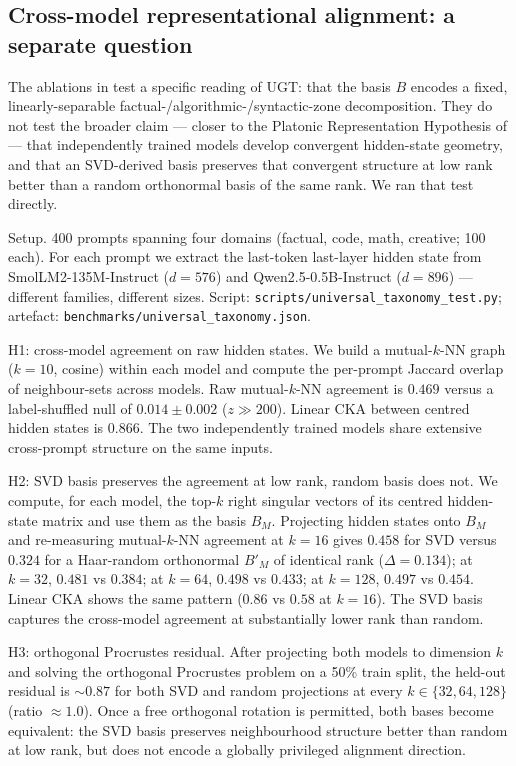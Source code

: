 \documentclass[11pt]{article}
\providecommand{\citet}[1]{\textcite{#1}}
\begin{document}
\subsection{Cross-model representational alignment: a separate question}
\label{sec:ugt-cross-model-universality}

The ablations in  test a specific reading
of UGT: that the basis $B$ encodes a fixed, linearly-separable
factual-/algorithmic-/syntactic-zone decomposition. They do not test
the broader claim --- closer to the Platonic Representation
Hypothesis of \citet{huh2024platonic} --- that independently trained
models develop convergent hidden-state geometry, and that an
SVD-derived basis preserves that convergent structure at low rank
better than a random orthonormal basis of the same rank. We ran that
test directly.

Setup. 400 prompts spanning four domains
(factual, code, math, creative; 100 each). For each prompt we extract
the last-token last-layer hidden state from SmolLM2-135M-Instruct
($d{=}576$) and Qwen2.5-0.5B-Instruct ($d{=}896$) --- different
families, different sizes. Script:
\texttt{scripts/universal\_taxonomy\_test.py};
artefact:
\texttt{benchmarks/universal\_taxonomy.json}.

H1: cross-model agreement on raw hidden states.
We build a mutual-$k$-NN graph ($k{=}10$, cosine) within each model
and compute the per-prompt Jaccard overlap of neighbour-sets across
models. Raw mutual-$k$-NN agreement is $0.469$ versus a label-shuffled
null of $0.014 \pm 0.002$ ($z \gg 200$). Linear CKA between centred
hidden states is $0.866$. The two independently trained models share
extensive cross-prompt structure on the same inputs.

H2: SVD basis preserves the agreement at low rank, random
basis does not. We compute, for each model, the top-$k$ right
singular vectors of its centred hidden-state matrix and use them as
the basis $B_M$. Projecting hidden states onto $B_M$ and re-measuring
mutual-$k$-NN agreement at $k{=}16$ gives $0.458$ for SVD versus
$0.324$ for a Haar-random orthonormal $B'_M$ of identical rank
($\Delta{=}0.134$); at $k{=}32$, $0.481$ vs $0.384$; at $k{=}64$,
$0.498$ vs $0.433$; at $k{=}128$, $0.497$ vs $0.454$. Linear CKA shows
the same pattern ($0.86$ vs $0.58$ at $k{=}16$). The SVD basis
captures the cross-model agreement at substantially lower rank than
random.

H3: orthogonal Procrustes residual.
After projecting both models to dimension $k$ and solving the
orthogonal Procrustes problem on a 50\% train split, the held-out
residual is $\sim 0.87$ for both SVD and random projections at every
$k \in \{32, 64, 128\}$ (ratio $\approx 1.0$). Once a free orthogonal
rotation is permitted, both bases become equivalent: the SVD basis
preserves neighbourhood structure better than random at low
rank, but does not encode a globally privileged alignment direction.
\end{document}
